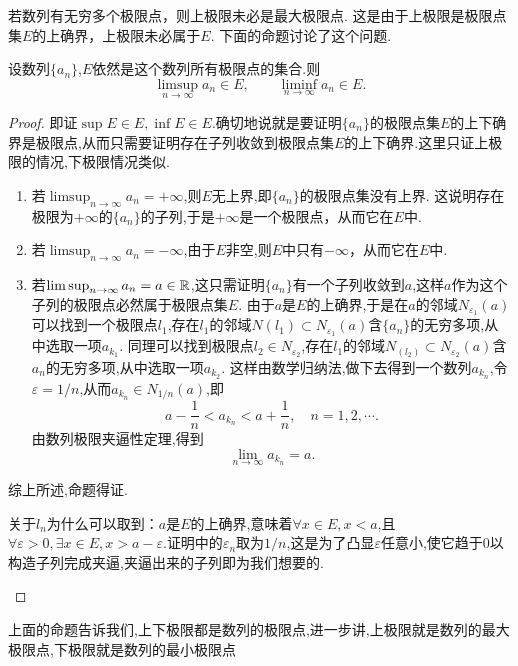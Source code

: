 若数列有无穷多个极限点，则上极限未必是最大极限点.
这是由于上极限是极限点集$E$的上确界，上极限未必属于$E$.
下面的命题讨论了这个问题.

\begin{proposition}
    设数列$\{a_n\}$,$E$依然是这个数列所有极限点的集合.则
    \[\limsup_{n\to\infty}a_n\in E,\qquad\liminf_{n\to\infty}a_n\in E.\]
\end{proposition}

\begin{proof}
   即证$\sup E\in E,\inf E\in E$.确切地说就是要证明$\{a_n\}$的极限点集$E$的上下确界是极限点,从而只需要证明存在子列收敛到极限点集$E$的上下确界.这里只证上极限的情况,下极限情况类似.
\begin{enumerate}
    \item 若$\limsup_{n\to\infty}a_n=+\infty$,则$E$无上界,即$\{a_n\}$的极限点集没有上界.
    这说明存在极限为$+\infty$的$\{a_n\}$的子列,于是$+\infty$是一个极限点，从而它在$E$中.
    \item 若$\limsup_{n\to\infty}a_n=-\infty$,由于$E$非空,则$E$中只有$-\infty$，从而它在$E$中.
    \item 若$\limsup_{n\to\infty}a_n=a\in\mathbb{R}$,这只需证明$\{a_n\}$有一个子列收敛到$a$,这样$a$作为这个子列的极限点必然属于极限点集$E$.
    由于$a$是$E$的上确界,于是在$a$的邻域$N_{\varepsilon_1}(a)$可以找到一个极限点$l_1$,存在$l_1$的邻域$N(l_1)\subset N_{\varepsilon_1}(a)$含$\{a_n\}$的无穷多项,从中选取一项$a_{k_1}$.
    同理可以找到极限点$l_2\in N_{\varepsilon_2}$,存在$l_1$的邻域$N_(l_2)\subset N_{\varepsilon_2}(a)$含$a_n$的无穷多项,从中选取一项$a_{k_2}$.
    这样由数学归纳法,做下去得到一个数列$a_{k_n}$,令$\varepsilon=1/n$,从而$a_{k_n}\in N_{1/n}(a)$,即
    \[a-\frac{1}{n}<a_{k_n}<a+\frac{1}{n},\quad n=1,2,\cdots.\]
    由数列极限夹逼性定理,得到
    \[\lim_{n\to\infty}a_{k_n}=a.\]
\end{enumerate}
综上所述,命题得证.
\begin{note}
    关于$l_n$为什么可以取到：$a$是$E$的上确界,意味着$\forall x\in E,x<a$,且$\forall \varepsilon>0,\exists x\in E,x>a-\varepsilon.$证明中的$\varepsilon_n$取为$1/n$,这是为了凸显$\varepsilon$任意小,使它趋于$0$以构造子列完成夹逼,夹逼出来的子列即为我们想要的.
\end{note}
\end{proof}

\begin{remark}
    上面的命题告诉我们,上下极限都是数列的极限点,进一步讲,上极限就是数列的最大极限点,下极限就是数列的最小极限点
\end{remark}

